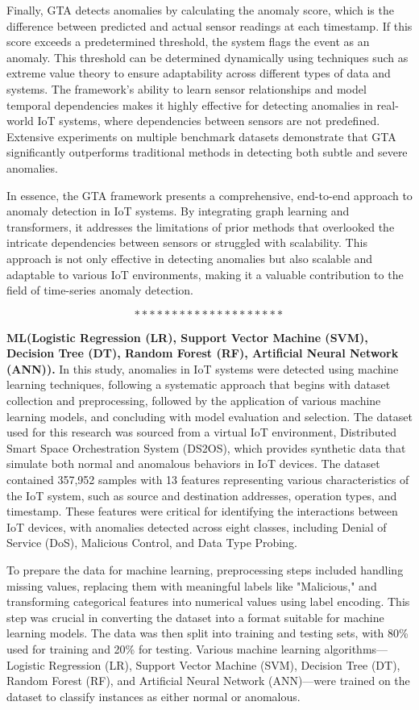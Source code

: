 Finally, GTA detects anomalies by calculating the anomaly score, which is the difference between predicted and actual sensor readings at each timestamp. If this score exceeds a predetermined threshold, the system flags the event as an anomaly. This threshold can be determined dynamically using techniques such as extreme value theory to ensure adaptability across different types of data and systems. The framework's ability to learn sensor relationships and model temporal dependencies makes it highly effective for detecting anomalies in real-world IoT systems, where dependencies between sensors are not predefined. Extensive experiments on multiple benchmark datasets demonstrate that GTA significantly outperforms traditional methods in detecting both subtle and severe anomalies.

In essence, the GTA framework presents a comprehensive, end-to-end approach to anomaly detection in IoT systems. By integrating graph learning and transformers, it addresses the limitations of prior methods that overlooked the intricate dependencies between sensors or struggled with scalability. This approach is not only effective in detecting anomalies but also scalable and adaptable to various IoT environments, making it a valuable contribution to the field of time-series anomaly detection\cite{75}.

$$********************$$

\textbf{ML(Logistic Regression (LR), Support Vector Machine (SVM), Decision Tree (DT), Random Forest (RF), Artificial Neural Network (ANN)). } In this study, anomalies in IoT systems were detected using machine learning techniques, following a systematic approach that begins with dataset collection and preprocessing, followed by the application of various machine learning models, and concluding with model evaluation and selection. The dataset used for this research was sourced from a virtual IoT environment, Distributed Smart Space Orchestration System (DS2OS), which provides synthetic data that simulate both normal and anomalous behaviors in IoT devices. The dataset contained 357,952 samples with 13 features representing various characteristics of the IoT system, such as source and destination addresses, operation types, and timestamp. These features were critical for identifying the interactions between IoT devices, with anomalies detected across eight classes, including Denial of Service (DoS), Malicious Control, and Data Type Probing.

To prepare the data for machine learning, preprocessing steps included handling missing values, replacing them with meaningful labels like "Malicious," and transforming categorical features into numerical values using label encoding. This step was crucial in converting the dataset into a format suitable for machine learning models. The data was then split into training and testing sets, with 80\% used for training and 20\% for testing. Various machine learning algorithms—Logistic Regression (LR), Support Vector Machine (SVM), Decision Tree (DT), Random Forest (RF), and Artificial Neural Network (ANN)—were trained on the dataset to classify instances as either normal or anomalous.

